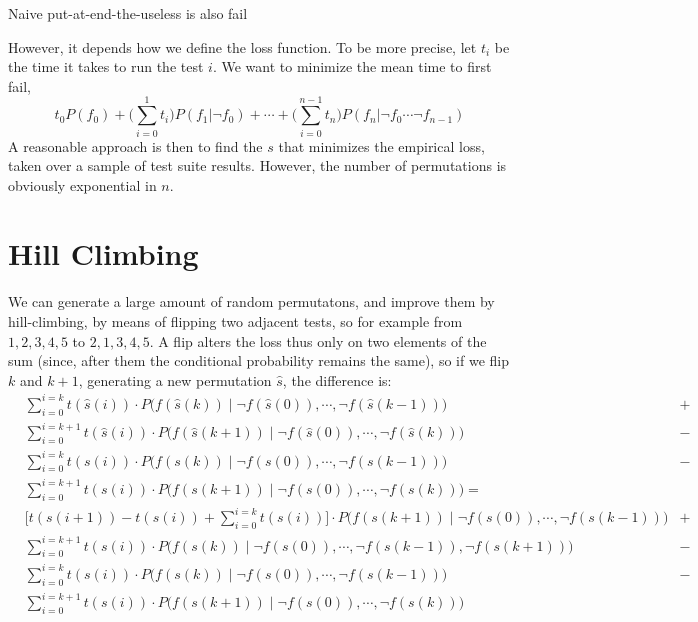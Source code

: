 \documentclass[12pt]{article}
\begin{document}
Naive put-at-end-the-useless is also fail

However, it depends how we define the loss function. To be more precise, let $t_i$ be the time it takes to run the test $i$. We want to minimize the mean time to first fail,
\[ t_0 P(f_0) + \big(\sum_{i=0}^1 t_i\big) P(f_1 | \neg f_0)  + \cdots + \big(\sum_{i=0}^{n-1} t_n\big) P(f_n | \neg f_0 \cdots \neg f_{n-1})\]
A reasonable approach is then to find the $s$ that minimizes the empirical loss, taken over a sample of test suite results. However, the number of permutations is obviously exponential in $n$.



\section{Hill Climbing}

We can generate a large amount of random permutatons, and improve them by hill-climbing, by means of flipping two adjacent tests, so for example from $1,2,3,4,5$ to $2,1,3,4,5$. A flip alters the loss thus only on two elements of the sum (since, after them the conditional probability remains the same), so if we flip $k$ and $k+1$, generating a new permutation $\hat{s}$, the difference is:
\begin{align}
  &\sum_{i=0}^{i=k} t(\hat{s}(i)) \cdot P\Big(f(\hat{s}(k)) \; \Big| \; \neg f(\hat{s}(0)), \cdots, \neg f(\hat{s}(k-1)) \Big) &+ \\
  &\sum_{i=0}^{i=k+1} t(\hat{s}(i)) \cdot P\Big(f(\hat{s}(k+1)) \; \Big| \; \neg f(\hat{s}(0)), \cdots, \neg f(\hat{s}(k)) \Big) &- \\
  &\sum_{i=0}^{i=k} t(s(i)) \cdot P\Big(f(s(k)) \; \Big| \; \neg f(s(0)), \cdots, \neg f(s(k-1)) \Big) &- \\
  &\sum_{i=0}^{i=k+1} t(s(i)) \cdot P\Big(f(s(k+1)) \; \Big| \; \neg f(s(0)), \cdots, \neg f(s(k)) \Big) = \\
  &\Big[ t(s(i+1)) - t(s(i)) + \sum_{i=0}^{i=k} t(s(i)) \Big] \cdot P\Big(f(s(k+1)) \; \Big| \; \neg f(s(0)), \cdots, \neg f(s(k-1)) \Big) &+ \\
  &\sum_{i=0}^{i=k+1} t(s(i)) \cdot P\Big(f(s(k)) \; \Big| \; \neg f(s(0)), \cdots, \neg f(s(k-1)), \neg f(s(k+1)) \Big) &- \\
  &\sum_{i=0}^{i=k} t(s(i)) \cdot P\Big(f(s(k)) \; \Big| \; \neg f(s(0)), \cdots, \neg f(s(k-1)) \Big) &- \\
  &\sum_{i=0}^{i=k+1} t(s(i)) \cdot P\Big(f(s(k+1)) \; \Big| \; \neg f(s(0)), \cdots, \neg f(s(k)) \Big)
\end{align}
\end{document}
